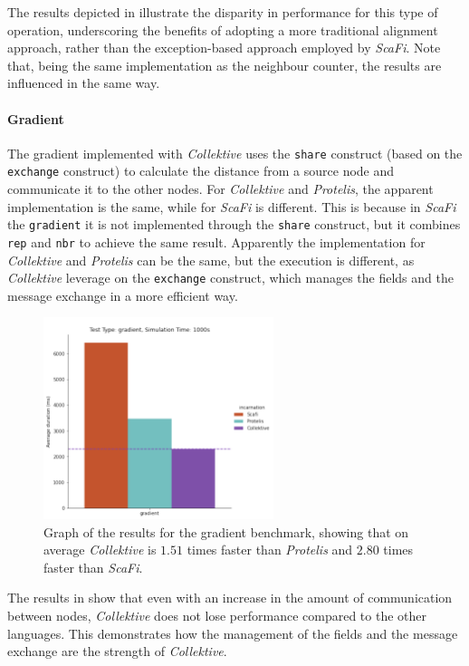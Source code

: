 The results depicted in  illustrate the disparity in performance for this type of operation,
underscoring the benefits of adopting a more traditional alignment approach, rather than the exception-based approach
employed by \emph{ScaFi}.
Note that, being the same implementation as the neighbour counter, the results are influenced in the same way.

\paragraph{Gradient}
The gradient implemented with \emph{Collektive} uses the \texttt{share} construct (based on the \texttt{exchange} construct) to
calculate the distance from a source node and communicate it to the other nodes.
For \emph{Collektive} and \emph{Protelis}, the apparent implementation is the same, while for \emph{ScaFi} is different.
This is because in \emph{ScaFi} the \texttt{gradient} it is not implemented through the \texttt{share} construct, but
it combines \texttt{rep} and \texttt{nbr} to achieve the same result.
Apparently the implementation for \emph{Collektive} and \emph{Protelis} can be the same, but the execution is different, as
\emph{Collektive} leverage on the \texttt{exchange} construct, which manages the fields and the message exchange
in a more efficient way.

\begin{figure}[ht!]
    \centering
    \includegraphics[width=0.6\textwidth]{figures/gradient-results}
    \caption{Graph of the results for the gradient benchmark, showing that on average \emph{Collektive} is $1.51$ times faster
    than \emph{Protelis} and $2.80$ times faster than \emph{ScaFi}.}
    \label{fig:gradient-resutls}
\end{figure}

The results in  show that even with an increase in the amount of communication between nodes,
\emph{Collektive} does not lose performance compared to the other languages.
This demonstrates how the management of the fields and the message exchange are the strength of \emph{Collektive}.

